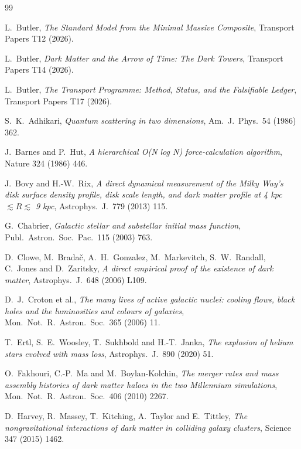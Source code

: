 \documentclass[11pt]{article}
\theoremstyle{definition}
\begin{document}
\begin{thebibliography}{99}

L.~Butler,
\emph{The Standard Model from the Minimal Massive Composite},
Transport Papers T12 (2026).

L.~Butler,
\emph{Dark Matter and the Arrow of Time: The Dark Towers},
Transport Papers T14 (2026).

L.~Butler,
\emph{The Transport Programme: Method, Status, and the Falsifiable Ledger},
Transport Papers T17 (2026).

S.~K.~Adhikari,
\emph{Quantum scattering in two dimensions},
Am.\ J.\ Phys.\ 54 (1986) 362.

J.~Barnes and P.~Hut,
\emph{A hierarchical O(N log N) force-calculation algorithm},
Nature 324 (1986) 446.

J.~Bovy and H.-W.~Rix,
\emph{A direct dynamical measurement of the Milky Way's disk surface density profile, disk scale length, and dark matter profile at 4 kpc $\lesssim R \lesssim$ 9 kpc},
Astrophys.\ J.\ 779 (2013) 115.

G.~Chabrier,
\emph{Galactic stellar and substellar initial mass function},
Publ.\ Astron.\ Soc.\ Pac.\ 115 (2003) 763.

D.~Clowe, M.~Brada\v{c}, A.~H.~Gonzalez, M.~Markevitch, S.~W.~Randall, C.~Jones and D.~Zaritsky,
\emph{A direct empirical proof of the existence of dark matter},
Astrophys.\ J.\ 648 (2006) L109.

D.~J.~Croton et al.,
\emph{The many lives of active galactic nuclei: cooling flows, black holes and the luminosities and colours of galaxies},
Mon.\ Not.\ R.\ Astron.\ Soc.\ 365 (2006) 11.

T.~Ertl, S.~E.~Woosley, T.~Sukhbold and H.-T.~Janka,
\emph{The explosion of helium stars evolved with mass loss},
Astrophys.\ J.\ 890 (2020) 51.

O.~Fakhouri, C.-P.~Ma and M.~Boylan-Kolchin,
\emph{The merger rates and mass assembly histories of dark matter haloes in the two Millennium simulations},
Mon.\ Not.\ R.\ Astron.\ Soc.\ 406 (2010) 2267.

D.~Harvey, R.~Massey, T.~Kitching, A.~Taylor and E.~Tittley,
\emph{The nongravitational interactions of dark matter in colliding galaxy clusters},
Science 347 (2015) 1462.


\end{thebibliography}
\end{document}
